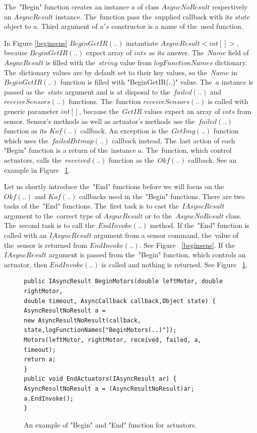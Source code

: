   The~"Begin" function creates an instance $a$ of class $AsyncNoResult$ respectively an $AsyncResult$ instance. 
  The~function pass the~supplied callback with its $state$ object to
  $a$. Third argument of $a's$ constructor is a name of the~used function.

  In Figure \ref{beginsens}  $BeginGetIR(..)$ instantiate $AsyncResult<int[]>$, because $BeginGetIR(..)$
  expect array of $ints$ as its answer. 
  The~$Name$ field of $AsyncResult$ is filled with the~$string$ value from $logFunctionNames$ dictionary. 
  The~dictionary values are by default set to their key values, so
  the~$Name$ in $BeginGetIR(..)$ function is filled with "BeginGetIR(..)" value.
  The~$a$ instance is passed as the~$state$ argument and is at disposal to the~$failed(..)$ and 
  $receiveSensors(..)$ functions.
  The~function $receiveSensors(..)$ is called with generic parameter $int[]$, 
  because the~$GetIR$ values expect an array of $ints$ from sensor.
  Sensor's methods as well as actuator's methods use the~$failed(..)$ function as its $Kof(..)$ callback.
  An exception is the~$GetImg(..)$ function which uses the~$failedBitmap(..)$ callback instead.
  The~last action of each "Begin" function is a return of the~instance $a$.
  The~function, which control actuators, calls the~$received(..)$ function as the~$Okf(..)$ callback. 
  See an example in Figure ~\ref{beginact}.

  Let us shortly introduce the~"End" functions before we will focus on the~$Okf(..)$ and 
  $Kof(..)$ callbacks used in the~"Begin" functions.
  There are two tasks of the~"End" functions.
  The~first task  is to cast the~$IAsyncResult$ argument to the~correct type of $AsyncResult$ 
  or to the~$AsyncNoResult$ class. The~second task is to call the~$EndInvoke(..)$ method.
  If the~"End" function is called with an $IAsyncResult$ argument from a sensor command, 
  the~value of the~sensor is returned from $EndInvoke(..)$. See Figure ~\ref{beginsens}. 
  If the~$IAsyncResult$ argument is passed from the~"Begin" function, 
  which controls an actuator, then $EndInvoke(..)$ is called and nothing is returned. See Figure ~\ref{beginact}.
  
\begin{figure}[!hbp]
\begin{lstlisting}
public IAsyncResult BeginMotors(double leftMotor, double rightMotor, 
double timeout, AsyncCallback callback,Object state) {
AsyncResultNoResult a = 
new AsyncResultNoResult(callback, state,logFunctionNames["BeginMotors(..)"]);
Motors(leftMotor, rightMotor, received, failed, a, timeout);
return a;
}
public void EndActuators(IAsyncResult ar) {
AsyncResultNoResult a = (AsyncResultNoResult)ar;
a.EndInvoke();
}
\end{lstlisting}	
\caption{An example of "Begin" and "End" function for actuators.} \label{beginact}
\end{figure}
 
